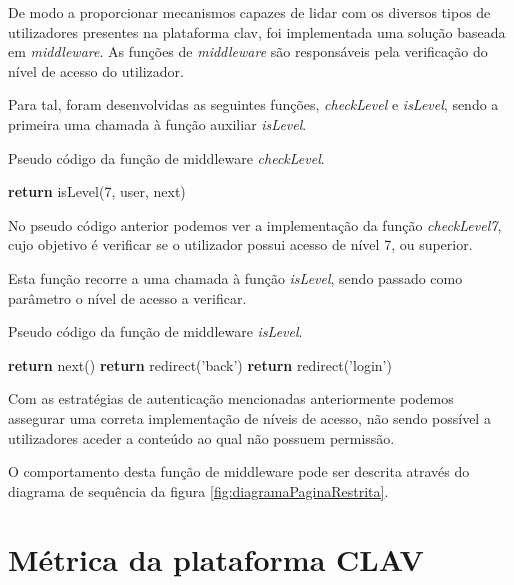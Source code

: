 De modo a proporcionar mecanismos capazes de lidar com os diversos tipos de utilizadores presentes na plataforma \gls{clav}, foi implementada uma solução baseada em \emph{middleware}. As funções de \emph{middleware} são responsáveis pela verificação do nível de acesso do utilizador. 

Para tal, foram desenvolvidas as seguintes funções, \emph{checkLevel} e \emph{isLevel}, sendo a primeira uma chamada à função auxiliar \emph{isLevel}.

\begin{algorithm}
    \caption{Pseudo código da função de middleware \emph{checkLevel}.}
    \begin{algorithmic}[1]
            \State \textbf{return} isLevel(7, user, next)
    \EndFunction
    \end{algorithmic}
\end{algorithm}

No pseudo código anterior podemos ver a implementação da função \emph{checkLevel7}, cujo objetivo é verificar se o utilizador possui acesso de nível 7, ou superior.

Esta função recorre a uma chamada à função \emph{isLevel}, sendo passado como parâmetro o nível de acesso a verificar.

\begin{algorithm}
    \caption{Pseudo código da função de middleware \emph{isLevel}.}
    \begin{algorithmic}[1]
                \State \textbf{return} next()
            \Else
                \State \textbf{return} redirect('back')
            \EndIf
        \Else
            \State \textbf{return} redirect('login')
        \EndIf
    \EndFunction
    \end{algorithmic}
\end{algorithm}

Com as estratégias de autenticação mencionadas anteriormente podemos assegurar uma correta implementação de níveis de acesso, não sendo possível a utilizadores aceder a conteúdo ao qual não possuem permissão.

O comportamento desta função de middleware pode ser descrita através do diagrama de sequência da figura \ref{fig:diagramaPaginaRestrita}.

\cleardoublepage
\section{Métrica da plataforma CLAV}

